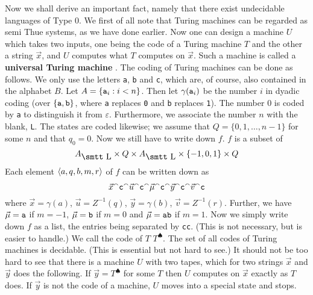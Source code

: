 Now we shall derive an important fact, namely that there exist undecidable
languages of Type 0. We first of all note that Turing machines can be
regarded as semi Thue systems, as we have done earlier. Now one can
design a machine $U$ which takes two inputs, one being the code
of a Turing machine $T$ and the other a string $\vec{x}$, and
$U$ computes what $T$ computes on $\vec{x}$.
Such a machine is called a \textbf{universal Turing machine}%
. The coding of Turing machines can
be done as follows. We only use the letters {\tt a}, {\tt b} and
{\tt c}, which are, of course, also contained in the alphabet $B$.
Let $A = \{\mbox{\tt a}_i : i < n\}$. Then let $\gamma(\mbox{\tt
a}_i)$ be the number $i$ in dyadic coding (over $\{\mbox{\tt
a},\mbox{\tt b}\}$, where {\tt a} replaces {\tt 0} and {\tt b}
replaces {\tt 1}). The number 0 is coded by {\tt a} to distinguish
it from $\varepsilon$. Furthermore, we associate the number $n$
with the blank, {\tt L}. The states are coded likewise; we assume
that $Q = \{0, 1, \dotsc, n-1\}$ for some $n$ and that $q_0 = 0$.
Now we still have to write down $f$. $f$ is a subset of
\begin{equation}
A_{\mbox{\smtt L}} \times Q \times A_{\mbox{\smtt L}} \times
\{-1,0, 1\} \times Q 
\end{equation}
Each element $\langle a, q, b, m, r\rangle$ of $f$ can be written down as
\begin{equation}
\vec{x} {^{\smallfrown}} \mbox{\tt c} {^{\smallfrown}} \vec{u} {^{\smallfrown}} \mbox{\tt c} {^{\smallfrown}}
\vec{\mu} {^{\smallfrown}} \mbox{\tt c} {^{\smallfrown}} \vec{y} {^{\smallfrown}} \mbox{\tt c} {^{\smallfrown}}
    \vec{v} {^{\smallfrown}} \mbox{\tt c} 
\end{equation}
where $\vec{x} = \gamma(a)$, $\vec{u} = Z^{-1}(q)$,
$\vec{y} = \gamma(b)$, $\vec{v} = Z^{-1}(r)$.
Further, we have $\vec{\mu} = \mbox{\tt a}$ if $m = -1$,
$\vec{\mu} = \mbox{\tt b}$ if $m = 0$ and
$\vec{\mu} = \mbox{\tt ab}$ if $m = 1$.
Now we simply write down $f$ as a list, the entries being
separated by {\tt cc}. (This is not necessary, but is easier to
handle.) We call the code of $T$ $T^{\spadesuit}$. The set of
all codes of Turing machines is decidable. (This is essential
but not hard to see.) It should not be too hard to see that
there is a machine $U$ with two tapes, which for two strings
$\vec{x}$ and $\vec{y}$ does the following. If $\vec{y} =
T^{\spadesuit}$ for some $T$ then $U$ computes on $\vec{x}$
exactly as $T$ does. If $\vec{y}$ is not the code of a machine,
$U$ moves into a special state and stops.

